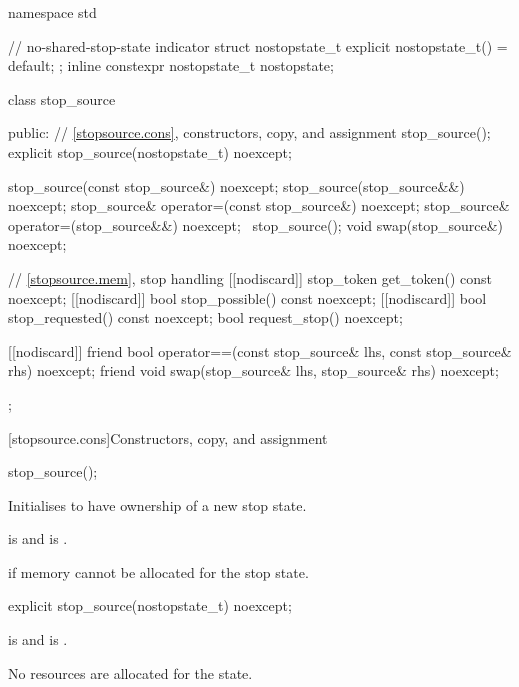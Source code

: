 \begin{codeblock}
namespace std {
  // no-shared-stop-state indicator
  struct nostopstate_t {
    explicit nostopstate_t() = default;
  };
  inline constexpr nostopstate_t nostopstate{};

  class stop_source {
  public:
    // \ref{stopsource.cons}, constructors, copy, and assignment
    stop_source();
    explicit stop_source(nostopstate_t) noexcept;

    stop_source(const stop_source&) noexcept;
    stop_source(stop_source&&) noexcept;
    stop_source& operator=(const stop_source&) noexcept;
    stop_source& operator=(stop_source&&) noexcept;
    ~stop_source();
    void swap(stop_source&) noexcept;

    // \ref{stopsource.mem}, stop handling
    [[nodiscard]] stop_token get_token() const noexcept;
    [[nodiscard]] bool stop_possible() const noexcept;
    [[nodiscard]] bool stop_requested() const noexcept;
    bool request_stop() noexcept;

    [[nodiscard]] friend bool
      operator==(const stop_source& lhs, const stop_source& rhs) noexcept;
    friend void swap(stop_source& lhs, stop_source& rhs) noexcept;
  };
}
\end{codeblock}

[stopsource.cons]{Constructors, copy, and assignment}

%
\begin{itemdecl}
stop_source();
\end{itemdecl}

\begin{itemdescr}
\pnum
\effects
Initialises  to have ownership of a new stop state.

\pnum
\ensures
{} is 
and  is .

\pnum
\throws
{} if memory cannot be allocated for the stop state.
\end{itemdescr}

%
\begin{itemdecl}
explicit stop_source(nostopstate_t) noexcept;
\end{itemdecl}

\begin{itemdescr}
\pnum
\ensures
{} is  and
 is .
\begin{note}
No resources are allocated for the state.
\end{note}
\end{itemdescr}


